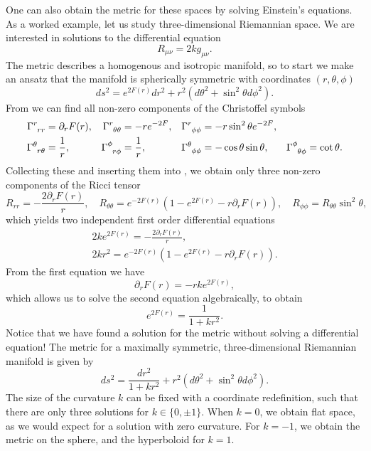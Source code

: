 One can also obtain the metric for these spaces by solving Einstein's equations. As a worked example, let us study three-dimensional Riemannian space. We are interested in solutions to the differential equation
\begin{equation*}
	R_{\mu \nu} = 2k g_{\mu \nu}.
\end{equation*}
The metric describes a homogenous and isotropic manifold, so to start we make an ansatz that the manifold is spherically symmetric with coordinates $(r, \theta, \phi)$
\begin{equation*}
	ds^2 = e^{2F(r)} dr^2 + r^2 (d\theta^2 + \sin^2\theta d\phi^2).
\end{equation*}
From  we can find all non-zero components of the Christoffel symbols
\begin{equation}
   \begin{aligned}
    \tensor{\Gamma}{^{r}_{rr}} &=  \partial_r F(r), & 
    \tensor{\Gamma}{^{r}_{\theta \theta}} &= -re^{-2F}, &
    \tensor{\Gamma}{^{r}_{\phi \phi}} &= -r\sin^2\theta e^{-2F}, &
     & \\
    \tensor{\Gamma}{^{\theta}_{r \theta}} &= \frac{1}{r}, &
    \tensor{\Gamma}{^{\phi}_{r \phi}} &= \frac{1}{r}, &
    \tensor{\Gamma}{^{\theta}_{ \phi \phi}} &= -\cos \theta \sin \theta, &
    \tensor{\Gamma}{^{\phi}_{\theta \phi}} &= \cot \theta.
   \end{aligned}
\end{equation}
Collecting these and inserting them into , we obtain only three non-zero components of the Ricci tensor
\begin{equation*}
	R_{rr} = -\frac{2 \partial_r F(r)}{r}, \quad R_{\theta \theta} = e^{-2F(r)} \left(1 - e^{2F(r)} - r \partial_r F(r) \right), \quad R_{\phi \phi} = R_{\theta \theta} \sin^2 \theta ,
\end{equation*}
which yields two independent first order differential equations
\begin{gather*}
	2k e^{2F(r)} = -\frac{2 \partial_r F(r)}{r}, \\ 
	2kr^2 = e^{-2F(r)} \left(1 - e^{2F(r)} - r \partial_r F(r) \right).		
\end{gather*}
From the first equation we have
\begin{equation*}
	\partial_r F(r) = -r k e^{2F(r)},
\end{equation*}
which allows us to solve the second equation algebraically, to obtain
\begin{equation*}
	e^{2F(r)} = \frac{1}{1 + k r^2}.
\end{equation*}
Notice that we have found a solution for the metric without solving a differential equation! The metric for a maximally symmetric, three-dimensional Riemannian manifold is given by
\begin{equation*}
	ds^2 = \frac{dr^2}{1 + k r^2}  + r^2 (d\theta^2 + \sin^2\theta d\phi^2).
\end{equation*}
The size of the curvature $k$ can be fixed with a coordinate redefinition, such that there are only three solutions for $k \in \{0,\pm 1\}$. When $k = 0$, we obtain flat space, as we would expect for a solution with zero curvature. For $k = -1$, we obtain the metric on the sphere, and the hyperboloid for $k = 1$.



